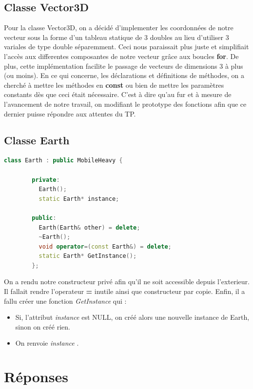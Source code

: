 \documentclass{article}
\begin{document}
    \subsection{Classe Vector3D}
      Pour la classe Vector3D, on a décidé d'implementer les coordonnées de
      notre vecteur sous la forme d'un tableau statique de 3 doubles au lieu
      d'utiliser 3 variales de type double séparemment. Ceci nous paraissait
      plus juste et simplifiait l'accès aux differentes composantes de notre
      vecteur grâce aux boucles \textbf{for}. De plus, cette implémentation
      facilite le passage de vecteurs de dimensions 3 à plus (ou moins).  En ce
      qui concerne, les déclarations et définitions de méthodes, on a cherché à
      mettre les méthodes en \textbf{const} ou bien de mettre les paramètres
      constants dès que ceci était nécessaire. C'est à dire qu'au fur et à
      mesure de l'avancement de notre travail, on modifiant le prototype des
      fonctions afin que ce dernier puisse répondre aux attentes du TP.
    
    \subsection{Classe Earth}
      \begin{lstlisting}[language=C++]
      class Earth : public MobileHeavy {
          
        private:
          Earth();
          static Earth* instance;

        public:
          Earth(Earth& other) = delete;
          ~Earth();
          void operator=(const Earth&) = delete;
          static Earth* GetInstance();
        };
      \end{lstlisting}

      On a rendu notre constructeur privé afin qu'il ne soit accessible depuis
      l'exterieur. Il fallait rendre l'operateur \textbf{=} inutile ainsi que
      constructeur par copie.
      Enfin, il a fallu créer une fonction \textit{GetInstance} qui : 
      \begin{itemize}
        \item Si, l'attribut \textit{instance} est NULL, on créé alors une
          nouvelle instance de Earth, sinon on créé rien.
        \item On renvoie \textit{instance} .
      \end{itemize}


\section{Réponses}
\end{document}
